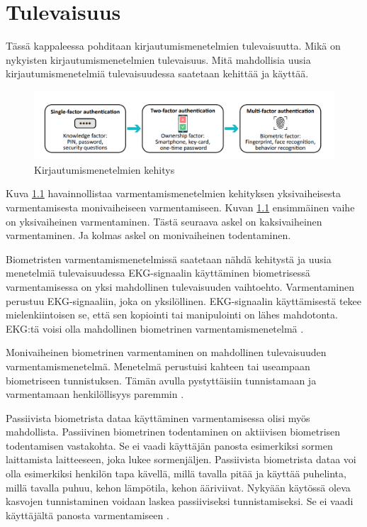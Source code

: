 \chapter{Tulevaisuus\label{tulevaisuus}}

Tässä kappaleessa pohditaan kirjautumismenetelmien tulevaisuutta. Mikä on nykyisten kirjautumismenetelmien tulevaisuus. Mitä mahdollisia uusia kirjautumismenetelmiä tulevaisuudessa saatetaan kehittää ja käyttää.

\begin{figure}[ht]
    \centering
    \includegraphics[width=12cm]{template/figures/Evolution-of-authentication-methods.PNG}
    \caption{Kirjautumismenetelmien kehitys \citep{cryptography2010001}}
    \label{fig:authentication-evolution}
\end{figure}

Kuva \ref{fig:authentication-evolution} havainnollistaa varmentamismenetelmien kehityksen yksivaiheisesta varmentamisesta monivaiheiseen varmentamiseen. Kuvan \ref{fig:authentication-evolution} ensimmäinen vaihe on yksivaiheinen varmentaminen. Tästä seuraava askel on kaksivaiheinen varmentaminen. Ja kolmas askel on monivaiheinen todentaminen. 

Biometristen varmentamismenetelmissä saatetaan nähdä kehitystä ja uusia menetelmiä tulevaisuudessa EKG-signaalin käyttäminen biometrisessä varmentamisessa on yksi mahdollinen tulevaisuuden vaihtoehto. Varmentaminen perustuu EKG-signaaliin, joka on yksilöllinen. EKG-signaalin käyttämisestä tekee mielenkiintoisen se, että sen kopiointi tai manipulointi on lähes mahdotonta. EKG:tä voisi olla mahdollinen biometrinen varmentamismenetelmä \citep{shdefat2018utilizing}.

Monivaiheinen biometrinen varmentaminen on mahdollinen tulevaisuuden varmentamismenetelmä. Menetelmä perustuisi kahteen tai useampaan biometriseen tunnistuksen. Tämän avulla pystyttäisiin tunnistamaan ja varmentamaan henkilöllisyys paremmin \citep{biometric_authentication_systems}.

Passiivista biometrista dataa käyttäminen varmentamisessa olisi myös mahdollista. Passiivinen biometrinen todentaminen on aktiivisen biometrisen todentamisen vastakohta. Se ei vaadi käyttäjän panosta esimerkiksi sormen laittamista laitteeseen, joka lukee sormenjäljen. Passiivista biometrista dataa voi olla esimerkiksi henkilön tapa kävellä, millä tavalla pitää ja käyttää puhelinta, millä tavalla puhuu, kehon lämpötila, kehon ääriviivat. Nykyään käytössä oleva kasvojen tunnistaminen voidaan laskea passiiviseksi tunnistamiseksi. Se ei vaadi käyttäjältä panosta varmentamiseen \citep{biometric_authentication_systems} \citep{passive_biometrics}.



